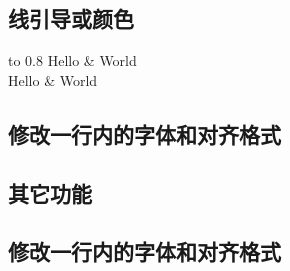 \documentclass{article}
\begin{document}

\subsection{线引导或颜色}

\begin{table}[H]
  \setlength\doublerulesep{1pt}
  \centering
  \begin{tabu} to 0.8\textwidth {|[1.5pt] |[0.5pt] X[c] | X[c] | [0.5pt] |
      [1.5pt ]} 
    Hello & World \\
    Hello & World \\
    \hline
  \end{tabu}
\end{table}

\subsection{修改一行内的字体和对齐格式}

\subsection{其它功能}
\subsection{修改一行内的字体和对齐格式}
\end{document}
